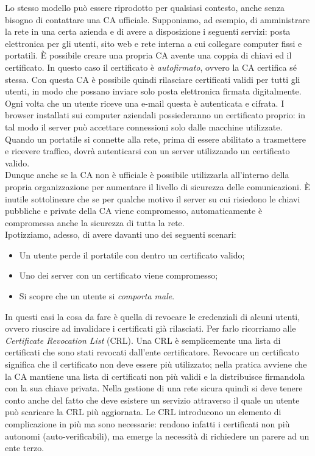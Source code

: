 Lo stesso modello può essere riprodotto per qualsiasi contesto, anche senza bisogno di contattare una CA ufficiale. Supponiamo, ad esempio, di amministrare la rete in una certa azienda e di avere a disposizione i seguenti servizi: posta elettronica per gli utenti, sito web e rete interna a cui collegare computer fissi e portatili. È possibile creare una propria CA avente una coppia di chiavi ed il certificato. In questo caso il certificato è \textit{autofirmato}, ovvero la CA certifica sé stessa. Con questa CA è possibile quindi rilasciare certificati validi per tutti gli utenti, in modo che possano inviare solo posta elettronica firmata digitalmente. Ogni volta che un utente riceve una e-mail questa è autenticata e cifrata. I browser installati sui computer aziendali possiederanno un certificato proprio: in tal modo il server può accettare connessioni solo dalle macchine utilizzate. Quando un portatile si connette alla rete, prima di essere abilitato a trasmettere e ricevere traffico, dovrà autenticarsi con un server utilizzando un certificato valido.\\
Dunque anche se la CA non è ufficiale è possibile utilizzarla all'interno della propria organizzazione per aumentare il livello di sicurezza delle comunicazioni. È inutile sottolineare che se per qualche motivo il server su cui risiedono le chiavi pubbliche e private della CA viene compromesso, automaticamente è compromessa anche la sicurezza di tutta la rete.\\
Ipotizziamo, adesso, di avere davanti uno dei seguenti scenari:
\begin{itemize}
	\item Un utente perde il portatile con dentro un certificato valido;
	\item Uno dei server con un certificato viene compromesso;
	\item Si scopre che un utente si \textit{comporta male}.
\end{itemize}
In questi casi la cosa da fare è quella di revocare le credenziali di alcuni utenti, ovvero riuscire ad invalidare i certificati già rilasciati. Per farlo ricorriamo alle \textit{Certificate Revocation List} (CRL). Una CRL è semplicemente una lista di certificati che sono stati revocati dall'ente certificatore. Revocare un certificato significa che il certificato non deve essere più utilizzato; nella pratica avviene che la CA mantiene una lista di certificati non più validi e la distribuisce firmandola con la sua chiave privata. Nella gestione di una rete sicura quindi si deve tenere conto anche del fatto che deve esistere un servizio attraverso il quale un utente può scaricare la CRL più aggiornata. Le CRL introducono un elemento di complicazione in più ma sono necessarie: rendono infatti i certificati non più autonomi (auto-verificabili), ma emerge la necessità di richiedere un parere ad un ente terzo.


